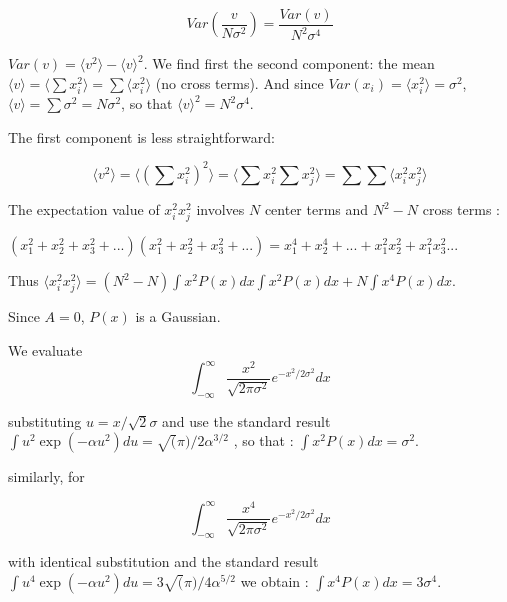 \documentclass[fleqn,usenatbib]{mnras}  %
\begin{document}
\begin{equation} 
Var\left(\frac{v}{N \sigma^{2}}\right) = \frac{Var(v)}{N^{2} \sigma^{4}} 
\end{equation}

$Var(v) = \langle v^{2} \rangle - \langle v \rangle ^{2}$. We find first the second component:  the mean $\langle v \rangle = \langle \sum x_{i}^{2} \rangle = \sum \langle x_{i}^{2} \rangle $ (no cross terms). And since $Var(x_{i}) = \langle x_{i}^{2} \rangle= \sigma^{2}$, $\langle v \rangle = \sum \sigma^{2} = N \sigma^{2}$, so that $\langle v \rangle ^{2} = N^{2} \sigma^{4}$. 

The first component is less straightforward: 

\begin{equation}
\langle v^{2} \rangle  = \langle (\sum x_{i}^{2} ) ^{2} \rangle  =  \langle \sum x_{i}^{2}  \sum x_{j}^{2}   \rangle = \sum \sum \langle x_{i}^{2} x_{j}^{2} \rangle
\end{equation}

The expectation value of $x_{i}^{2} x_{j}^{2}$ involves $N$ center terms and $N^{2}-N$ cross terms : 

$(x_{1}^{2} + x_{2}^{2} +x_{3}^{2} +...)(x_{1}^{2} + x_{2}^{2} +x_{3}^{2} +...)= x_{1}^{4} + x_{2}^{4}+...+x_{1}^{2}x_{2}^{2} + x_{1}^{2}x_{3}^{2}...$

Thus $\langle x_{i}^{2} x_{j}^{2} \rangle = (N^{2}-N) \int x^{2} P(x) dx \int x^{2} P(x) dx  + N \int x^{4} P(x) dx  $. 

Since $A=0$, $P(x)$ is a Gaussian. 

We evaluate 
\begin{equation}
\int_{-\infty}^{\infty} \frac{x^{2}}{\sqrt{2\pi \sigma^{2}}} e^{-x^{2} / 2 \sigma^{2}} dx 
\end{equation}

substituting $u = x / \sqrt{2} \sigma$ and use the standard result  $\int u^{2} \exp(-\alpha u^{2})du = \sqrt(\pi)/2\alpha^{3/2}$ , so that :   $\int x^{2} P(x) dx = \sigma^{2}$. 

similarly, for 

\begin{equation}
\int_{-\infty}^{\infty} \frac{x^{4}}{\sqrt{2\pi \sigma^{2}}} e^{-x^{2} / 2 \sigma^{2}} dx 
\end{equation}

with identical substitution and the standard result  $\int u^{4} \exp(-\alpha u^{2})du =3 \sqrt(\pi)/4\alpha^{5/2}$ we obtain : $\int x^{4} P(x) dx = 3 \sigma^{4}$.  
\end{document}
